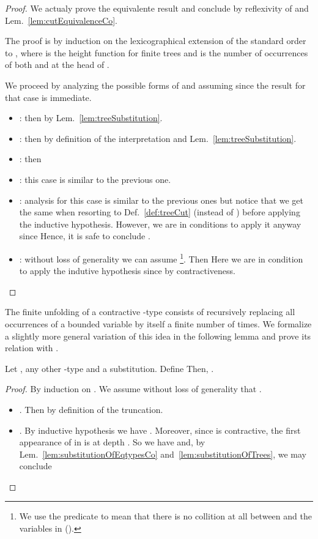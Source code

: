 \begin{proof}
We actualy prove the equivalente result  and conclude by
reflexivity of  and Lem.~\ref{lem:cutEquivalenceCo}.

The proof is by induction on the lexicographical extension of the standard
order to
,
where  is the height function for finite trees
and  is the number of occurrences of both
 and  at the head of .

We proceed by analyzing the possible forms of  and assuming  since
the result for that case is immediate.
\begin{itemize}
  \item : then  by
  Lem.~\ref{lem:treeSubstitution}.
  
  \item : then  by
  definition of the interpretation and Lem.~\ref{lem:treeSubstitution}.
  
  \item : then 
  
  \item : this case is similar to the previous one.
  
  \item : analysis for this case is similar to the
  previous ones but notice that we get the same  when resorting to
  Def.~\ref{def:treeCut} (instead of ) before applying the inductive
  hypothesis. However, we are in conditions to apply it anyway since
   Hence, it
  is safe to conclude .
  
  \item : without loss of generality we can assume
  \footnote{We use the predicate  to
  mean that there is no collition at all between  and the variables in
   (\ie ).}. Then  Here we are in condition to apply the indutive hypothesis since
   by contractiveness.
\end{itemize}
\end{proof}



The finite unfolding of a contractive -type  consists of recursively
replacing all occurrences of a bounded variable  by  itself a finite
number of times. We formalize a slightly more general variation of this idea in
the following lemma and prove its relation with .

\begin{lemma}
\label{lem:cutFiniteUnfolding}
Let ,  any other -type and  a
substitution. Define  Then, .
\end{lemma}

\begin{proof}
By induction on . We assume without loss of generality that .
\begin{itemize}
  \item . Then  by definition of the truncation.
  
  \item . By inductive hypothesis we have
  . Moreover, since  is
  contractive, the first appearance of  in  is at depth . So we
  have  and, by Lem.~\ref{lem:substitutionOfEqtypesCo}
  and~\ref{lem:substitutionOfTrees}, we may conclude 
\end{itemize}
\end{proof}

